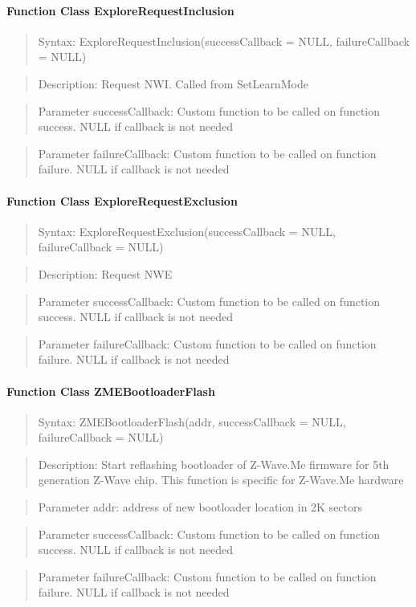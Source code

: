 \paragraph{Function Class ExploreRequestInclusion}
\begin{quote}Syntax: ExploreRequestInclusion(successCallback = NULL, failureCallback = NULL)\end{quote}
\begin{quote}Description: Request NWI. Called from SetLearnMode\end{quote}
\begin{quote}Parameter successCallback: Custom function to be called on function success. NULL if callback is not needed\end{quote}
\begin{quote}Parameter failureCallback: Custom function to be called on function failure. NULL if callback is not needed\end{quote}


\paragraph{Function Class ExploreRequestExclusion}
\begin{quote}Syntax: ExploreRequestExclusion(successCallback = NULL, failureCallback = NULL)\end{quote}
\begin{quote}Description: Request NWE\end{quote}
\begin{quote}Parameter successCallback: Custom function to be called on function success. NULL if callback is not needed\end{quote}
\begin{quote}Parameter failureCallback: Custom function to be called on function failure. NULL if callback is not needed\end{quote}


\paragraph{Function Class ZMEBootloaderFlash}
\begin{quote}Syntax: ZMEBootloaderFlash(addr, successCallback = NULL, failureCallback = NULL)\end{quote}
\begin{quote}Description: Start reflashing bootloader of Z-Wave.Me firmware for 5th generation Z-Wave chip. This function is specific for Z-Wave.Me hardware\end{quote}
\begin{quote}Parameter addr: address of new bootloader location in 2K sectors\end{quote}
\begin{quote}Parameter successCallback: Custom function to be called on function success. NULL if callback is not needed\end{quote}
\begin{quote}Parameter failureCallback: Custom function to be called on function failure. NULL if callback is not needed\end{quote}


